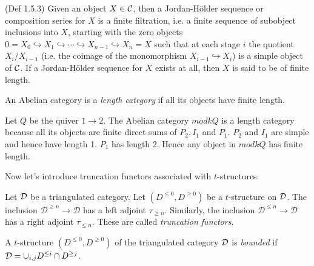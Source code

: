 \begin{definition}
\cite{EGNO}(Def 1.5.3) Given an object $X\in\mathcal{C}$, then a Jordan-H\"older sequence or composition series for $X$ is a finite filtration, i.e. a finite sequence of subobject inclusions into $X$, starting with the zero objects $0=X_0\hookrightarrow X_1\hookrightarrow\cdots\hookrightarrow X_{n-1}\hookrightarrow X_n=X$ such that at each stage $i$ the quotient $X_i/X_{i-1}$ (i.e. the coimage of the monomorphism $X_{i-1}\hookrightarrow X_i$) is a simple object of $\mathcal{C}$. If a Jordan-H\"older sequence for $X$ exists at all, then $X$ is said to be of finite length.
\end{definition}
\begin{definition}
An Abelian category is a \textit{length category} if all its objects have finite length.
\end{definition}
\begin{example}
Let $Q$ be the quiver $1\to 2$. The Abelian category $mod kQ$ is a length category because all its objects are finite direct sums of $P_2, I_1$ and $P_1$. $P_2$ and $I_1$ are simple and hence have length 1. $P_1$ has length 2. Hence any object in $mod kQ$ has finite length.
\end{example}
\indent Now let's introduce truncation functors associated with $t$-structures. 
\begin{lemma}
\cite{BBD}  Let $\mathcal{D}$ be a triangulated category. Let $(D^{\leq 0},D^{\geq 0})$ be a $t$-structure on $\mathcal{D}$. The inclusion ${\mathcal{D}^{\geq n} \rightarrow \mathcal{D}}$ has a left adjoint ${\tau_{\geq n}}$. Similarly, the inclusion ${\mathcal{D}^{\leq n} \rightarrow \mathcal{D}}$ has a right adjoint ${\tau_{\leq n}}$. These are called \textit{truncation functors}.
\end{lemma}
\begin{definition}
\cite{B07} A $t$-structure $(D^{\leq 0},D^{\geq 0})$ of the triangulated category $\mathcal{D}$ is \textit{bounded} if $\mathcal{D} = \cup_{i,j} D^{\leq i}\cap D^{\geq j}$.
\end{definition}
